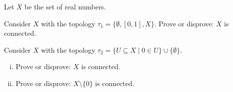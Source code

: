 \begin{comment}

\ExerciseSolution

\ba

\item  First suppose that $X$ is disconnected. Then there are nonempty disjoint open sets $A$ and $B$ such that $X = A \cup B$. This implies that $X \setminus A = B$ and so $A$ is also closed. Thus, $A$ is both open and closed. 

Now suppose that $A$ is a proper subset of $X$ that is both open and closed. Then $B = X \setminus A$ is open and $X$ is the disjoint union of $A$ and $B$. Thus, $X$ is disconnected. 

\item First suppose that $X$ is disconnected. Then there are nonempty disjoint open sets $A$ and $B$ such that $X = A \cup B$. Let $Y = \{a,b\}$ with the discrete topology. Define $f: X \to Y$ by 
\[f(x) = \begin{cases} a &\text{ if } x \in A \\ b & \text{ if } x \in B.\end{cases}\]
 By definition, $f$ is a surjection. Note that $f^{-1}(\{a\}) = A$ and $f^{-1}(\{b\}) = B$, so $f^{-1}$ of any open set in $Y$ is open in $X$ and $f$ is continuous. 

Now suppose that there is a continuous surjection $f$ from $X$ to a two-point topological space $Y = \{a,b\}$ with the discrete topology. Let $A = f^{-1}(\{a\})$ and $B = f^{-1}(\{b\}$. Since $f$ is continuous, we know that $A$ and $B$ are open in $X$. The fact that $f$ is a surjection means that $A$ and $B$ are nonempty. Since every $x \in X$ maps to either $a$ or $b$, we conclude that $X = A \cup B$. Finally, we show that $A \cap B = \emptyset$. Suppose $x \in A \cap B$. Then $f(x) \in A$ and $f(x) \in B$. This implies that $f(x) = a$ and $f(x) = b$, and $a=b$.  This is impossible because $f$ is a function. Therefore, $X$ is disconnected. 

\ea

\end{comment}


\item Let $X$ be the set of real numbers. 
\ba
\item Consider $X$ with the topology $\tau_1 = \{\emptyset, [0,1], X\}$. Prove or disprove: $X$ is connected.

\item Consider $X$ with the topology $\tau_2 = \{U \subseteq X \mid 0 \in U\} \cup \{\emptyset\}$. 
	\begin{enumerate}[i.]
	\item Prove or disprove: $X$ is connected.
	
	\item Prove or disprove: $X \setminus \{0\}$ is connected.
	
	\end{enumerate}

